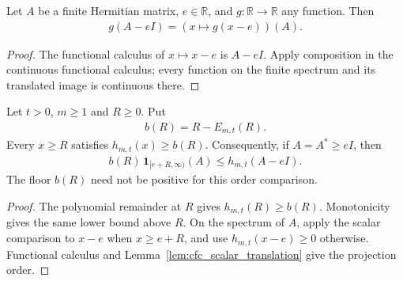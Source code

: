 \begin{lemma}
    \label{lem:cfc_scalar_translation}
    \leanok
    Let $A$ be a finite Hermitian matrix, $e\in\mathbb R$, and
    $g:\mathbb R\to\mathbb R$ any function. Then
    \begin{align}
        g(A-eI)=(x\mapsto g(x-e))(A).
    \end{align}
\end{lemma}
\begin{proof}\leanok
    The functional calculus of $x\mapsto x-e$ is $A-eI$.
    Apply composition in the continuous functional calculus; every
    function on the finite spectrum and its translated image is
    continuous there.
\end{proof}

\begin{lemma}
    \label{lem:soft_truncation_high_energy_floor}
    \leanok
    Let $t>0$, $m\geq1$ and $R\geq0$. Put
    \begin{align}
        b(R)=R-E_{m,t}(R).
    \end{align}
    Every $x\geq R$ satisfies $h_{m,t}(x)\geq b(R)$.
    Consequently, if $A=A^*\geq eI$, then
    \begin{align}
        b(R)\,\mathbf1_{[e+R,\infty)}(A)
        \leq h_{m,t}(A-eI).
    \end{align}
    The floor $b(R)$ need not be positive for this order comparison.
\end{lemma}
\begin{proof}\leanok
    The polynomial remainder at $R$ gives $h_{m,t}(R)\geq b(R)$.
    Monotonicity gives the same lower bound above $R$.
    On the spectrum of $A$, apply the scalar comparison to $x-e$ when
    $x\geq e+R$, and use $h_{m,t}(x-e)\geq0$ otherwise.
    Functional calculus and Lemma~\ref{lem:cfc_scalar_translation}
    give the projection order.
\end{proof}

